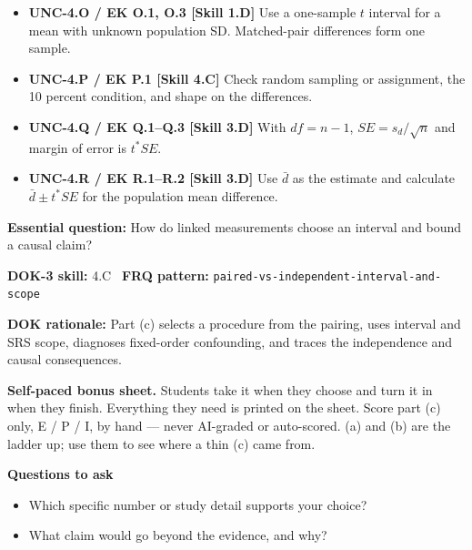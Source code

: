 \documentclass[11pt]{article}
\begin{document}


{\small
\begin{itemize}[leftmargin=1.5em,itemsep=2pt,topsep=2pt]
  \item \textbf{UNC-4.O / EK O.1, O.3 [Skill 1.D]} Use a one-sample $t$ interval for a mean with unknown population SD. Matched-pair differences form one sample.
  \item \textbf{UNC-4.P / EK P.1 [Skill 4.C]} Check random sampling or assignment, the 10 percent condition, and shape on the differences.
  \item \textbf{UNC-4.Q / EK Q.1--Q.3 [Skill 3.D]} With $df=n-1$, $SE=s_d/\sqrt n$ and margin of error is $t^*SE$.
  \item \textbf{UNC-4.R / EK R.1--R.2 [Skill 3.D]} Use $\bar d$ as the estimate and calculate $\bar d\pm t^*SE$ for the population mean difference.
\end{itemize}
}
\textbf{Essential question:} How do linked measurements choose an interval and bound a causal claim?\par
\textbf{DOK-3 skill:} 4.C \textperiodcentered\ \textbf{FRQ pattern:} {\small\texttt{paired-\allowbreak{}vs-\allowbreak{}independent-\allowbreak{}interval-\allowbreak{}and-\allowbreak{}scope}}\par
\textbf{DOK rationale:} Part (c) selects a procedure from the pairing, uses interval and SRS scope, diagnoses fixed-order confounding, and traces the independence and causal consequences.\par

\textbf{Self-paced bonus sheet.} Students take it when they choose and turn it in when they finish. Everything they need is printed on the sheet. Score part (c) only, E / P / I, by hand --- never AI-graded or auto-scored. (a) and (b) are the ladder up; use them to see where a thin (c) came from.\par

\textbf{Questions to ask}
\begin{itemize}[leftmargin=1.5em,itemsep=2pt,topsep=2pt]
  \item Which specific number or study detail supports your choice?
  \item What claim would go beyond the evidence, and why?
\end{itemize}
\end{document}
